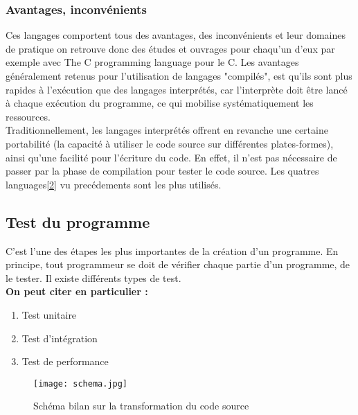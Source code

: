 \documentclass[12pt,a4paper]{article}
\begin{document}

    \subsubsection{Avantages, inconvénients}
    Ces langages comportent tous des avantages, des inconvénients et leur domaines de pratique on retrouve donc des études et ouvrages pour chaqu'un d'eux par exemple avec The C programming language\cite{livre1} pour le C. Les avantages généralement retenus pour l'utilisation de langages "compilés", est qu'ils sont plus rapides à l'exécution que des langages interprétés, car l'interprète doit être lancé à chaque exécution du programme, ce qui mobilise systématiquement les ressources.\\ Traditionnellement, les langages interprétés offrent en revanche une certaine portabilité (la capacité à utiliser le code source sur différentes plates-formes), ainsi qu'une facilité pour l'écriture du code. En effet, il n'est pas nécessaire de passer par la phase de compilation pour tester le code source. Les quatres languages\ref{2} vu precédements sont les plus utilisés.
    

    \subsection{Test du programme}
    C'est l'une des étapes les plus importantes de la création d'un programme. En principe, tout programmeur se doit de vérifier chaque partie d'un programme, de le tester. Il existe différents types de test. \\


    \textbf{On peut citer en particulier :}
    \begin{enumerate}
        \item Test unitaire
        \item Test d'intégration
        \item Test de performance
    \end{enumerate}


    \begin{figure}[ht]
        \centering
        \texttt{[image: schema.jpg]}
        \caption{Schéma bilan sur la transformation du code source}
        \label{Schéma bilan sur la transformation du code source}
    \end{figure}
\end{document}
